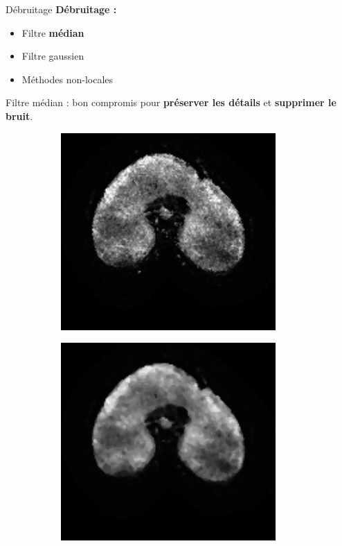 \documentclass[10pt]{beamer}
\begin{document}
\begin{frame}{Débruitage}
  \textbf{Débruitage :}
  \begin{itemize}
  \item Filtre \textbf{médian}
  \item Filtre gaussien
  \item Méthodes non-locales
  \end{itemize}

 \alert{Filtre médian} : bon compromis pour \textbf{préserver les détails} et \textbf{supprimer le bruit}.

 \begin{figure}[ht]
   \centering
   \begin{subfigure}[t]{0.33\textwidth}
     \centering
     \includegraphics[width=0.9\textwidth]{fig/before_median}
     \caption{}
     \label{subfig:before_median}
   \end{subfigure}%
   \begin{subfigure}[t]{0.33\textwidth}
     \centering
     \includegraphics[width=0.9\textwidth]{fig/after_median}
     \caption{}
     \label{subfig:after_median}
   \end{subfigure}%


\end{figure}
\end{frame}
\end{document}
